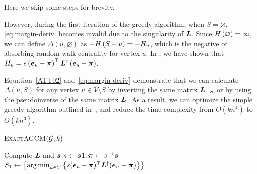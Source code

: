 \documentclass[10pt,journal,compsoc,twocolumn,twoside]{IEEEtran}
\begin{document}
Here we skip some steps for brevity.

However, during the first iteration of the greedy algorithm, when \(S=\varnothing\), \eqref{eq:margin-deriv} becomes invalid due to the singularity of \(\boldsymbol{L}\).
Since \(H\left(\varnothing\right)=\infty\), we can define \(\Delta(u,\varnothing)\) as \(-H\left(S+u\right)=-H_u\), which is the negative of absorbing random-walk centrality for vertex \(u\).
In , we have shown that \(H_u=s\left( \boldsymbol{e}_u-\boldsymbol{\pi} \right)^\top\boldsymbol{L}^{\dagger}\left( \boldsymbol{e}_u-\boldsymbol{\pi} \right)\).

Equation~\eqref{ATT02} and~\eqref{eq:margin-deriv} demonstrate that we can calculate \(\Delta(u,S)\) for any vertex \(u\in V\setminus S\) by inverting the same matrix \(\boldsymbol{L}_{-S}\) or by using the pseudoinverse of the same matrix \(\boldsymbol{L}\).
As a result, we can optimize the simple greedy algorithm outlined in~, and reduce the time complexity from \(O(kn^4)\) to \(O(kn^3)\).

\begin{algorithm}
    \caption{\textsc{ExactAGCM}\((\mathcal{G},k)\)}
    \label{algo:exact-agcm}
    Compute \(\boldsymbol{L}\) and \(\boldsymbol{s}\)\;
    \(s\gets\boldsymbol{s}\boldsymbol{1}\),\(\boldsymbol{\pi}\gets {s}^{-1}\boldsymbol{s}\)\;
    \(S_1\gets\left\{\operatorname*{arg\,min}_{u\in V}\left\{s(\boldsymbol{e}_u-\boldsymbol{\pi})^\top\boldsymbol{L}^\dagger(\boldsymbol{e}_u-\boldsymbol{\pi}) \right\} \right\}\)\;
\end{algorithm}
\end{document}

